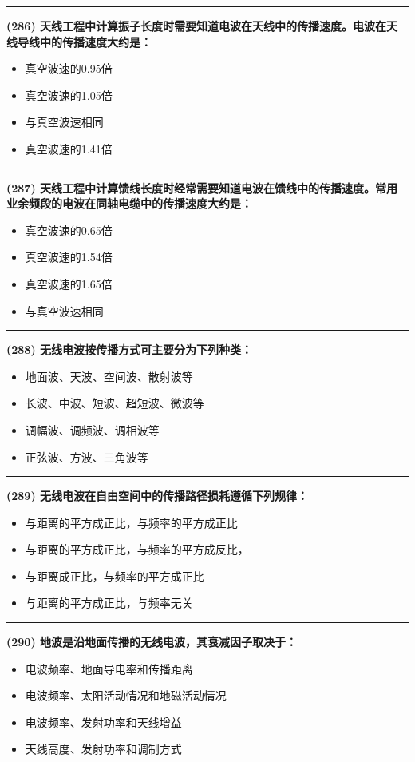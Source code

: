 \documentclass[twocolumn]{ctexart}  %
\begin{document}
\noindent\rule{0.5\textwidth}{1pt}
\heiti \textbf{(286) 天线工程中计算振子长度时需要知道电波在天线中的传播速度。电波在天线导线中的传播速度大约是：} \songti {\color{gray} [LK0973] }
\begin{itemize}
	\item  真空波速的0.95倍
	\item  真空波速的1.05倍
	\item  与真空波速相同
	\item  真空波速的1.41倍
\end{itemize}


\noindent\rule{0.5\textwidth}{1pt}
\heiti \textbf{(287) 天线工程中计算馈线长度时经常需要知道电波在馈线中的传播速度。常用业余频段的电波在同轴电缆中的传播速度大约是：} \songti {\color{gray} [LK0974] }
\begin{itemize}
	\item  真空波速的0.65倍
	\item  真空波速的1.54倍
	\item  真空波速的1.65倍
	\item  与真空波速相同
\end{itemize}


\noindent\rule{0.5\textwidth}{1pt}
\heiti \textbf{(288) 无线电波按传播方式可主要分为下列种类：} \songti {\color{gray} [LK1058] }
\begin{itemize}
	\item  地面波、天波、空间波、散射波等
	\item  长波、中波、短波、超短波、微波等
	\item  调幅波、调频波、调相波等
	\item  正弦波、方波、三角波等
\end{itemize}


\noindent\rule{0.5\textwidth}{1pt}
\heiti \textbf{(289) 无线电波在自由空间中的传播路径损耗遵循下列规律：} \songti {\color{gray} [LK1060] }
\begin{itemize}
	\item  与距离的平方成正比，与频率的平方成正比
	\item  与距离的平方成正比，与频率的平方成反比，
	\item  与距离成正比，与频率的平方成正比
	\item  与距离的平方成正比，与频率无关
\end{itemize}


\noindent\rule{0.5\textwidth}{1pt}
\heiti \textbf{(290) 地波是沿地面传播的无线电波，其衰减因子取决于：} \songti {\color{gray} [LK1067] }
\begin{itemize}
	\item  电波频率、地面导电率和传播距离
	\item  电波频率、太阳活动情况和地磁活动情况
	\item  电波频率、发射功率和天线增益
	\item  天线高度、发射功率和调制方式
\end{itemize}
\end{document}
